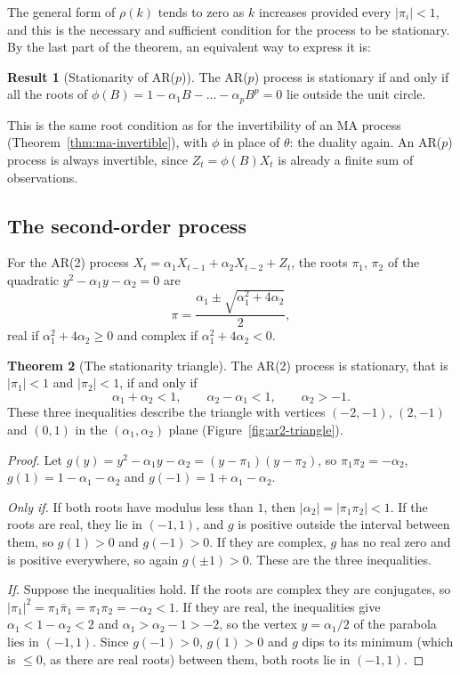 \documentclass[11pt,a4paper]{article}
\theoremstyle{definition}
\newtheorem{thm}{Theorem}[subsection]
\newtheorem{result}[thm]{Result}
\begin{document}
The general form of $\rho(k)$ tends to zero as $k$ increases provided every $|\pi_i| < 1$, and this is the necessary and sufficient
condition for the process to be stationary. By the last part of the theorem, an equivalent way to express it is:

\begin{result}[Stationarity of AR($p$)]
The AR($p$) process is stationary if and only if all the roots of $\phi(B) = 1 - \alpha_1B - \dots - \alpha_pB^p = 0$ lie outside the unit
circle.
\end{result}

This is the same root condition as for the invertibility of an MA process (Theorem~\ref{thm:ma-invertible}), with $\phi$ in place of $\theta$:
the duality again. An AR($p$) process is always invertible, since $Z_t = \phi(B)X_t$ is already a finite sum of observations.

\subsection{The second-order process}
For the AR(2) process $X_t = \alpha_1X_{t-1} + \alpha_2X_{t-2} + Z_t$, the roots $\pi_1$, $\pi_2$ of the quadratic $y^2 - \alpha_1y - \alpha_2 = 0$ are
\[
\pi = \frac{\alpha_1 \pm \sqrt{\alpha_1^2 + 4\alpha_2}}{2} ,
\]
real if $\alpha_1^2 + 4\alpha_2 \ge 0$ and complex if $\alpha_1^2 + 4\alpha_2 < 0$.

\begin{thm}[The stationarity triangle]\label{thm:ar2-triangle}
The AR(2) process is stationary, that is $|\pi_1| < 1$ and $|\pi_2| < 1$, if and only if
\[
\alpha_1 + \alpha_2 < 1 , \qquad \alpha_2 - \alpha_1 < 1 , \qquad \alpha_2 > -1 .
\]
These three inequalities describe the triangle with vertices $(-2, -1)$, $(2, -1)$ and $(0, 1)$ in the $(\alpha_1, \alpha_2)$ plane
(Figure~\ref{fig:ar2-triangle}).
\end{thm}

\begin{proof}
Let $g(y) = y^2 - \alpha_1y - \alpha_2 = (y - \pi_1)(y - \pi_2)$, so $\pi_1\pi_2 = -\alpha_2$, $g(1) = 1 - \alpha_1 - \alpha_2$ and $g(-1) = 1 + \alpha_1 - \alpha_2$.

\emph{Only if.} If both roots have modulus less than $1$, then $|\alpha_2| = |\pi_1\pi_2| < 1$. If the roots are real, they lie in $(-1, 1)$, and $g$ is
positive outside the interval between them, so $g(1) > 0$ and $g(-1) > 0$. If they are complex, $g$ has no real zero and
is positive everywhere, so again $g(\pm1) > 0$. These are the three inequalities.

\emph{If.} Suppose the inequalities hold. If the roots are complex they are conjugates, so $|\pi_1|^2 = \pi_1\bar\pi_1 = \pi_1\pi_2 = -\alpha_2 < 1$. If they are
real, the inequalities give $\alpha_1 < 1 - \alpha_2 < 2$ and $\alpha_1 > \alpha_2 - 1 > -2$, so the vertex $y = \alpha_1/2$ of the parabola lies in $(-1, 1)$. Since
$g(-1) > 0$, $g(1) > 0$ and $g$ dips to its minimum (which is $\le 0$, as there are real roots) between them, both roots lie
in $(-1, 1)$.
\end{proof}
\end{document}
